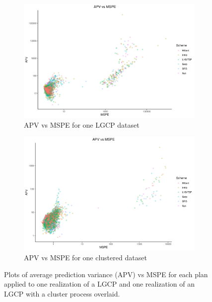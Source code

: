 \documentclass[review]{elsarticle}
\begin{document}
\begin{figure}

\begin{subfigure}{5in}
\includegraphics[width=5in]{../graphics/APV-MSPE-LGCP000004.png}
\caption{APV vs MSPE for one LGCP dataset}
\label{apvlgcp}
\end{subfigure}

\begin{subfigure}{5in}
\includegraphics[width=5in]{../graphics/APV-MSPE-Cluster000004.png}
\caption{APV vs MSPE for one clustered dataset}
\label{apvcluster}
\end{subfigure}

\caption{Plots of average prediction variance (APV) vs MSPE for each plan
applied to one realization of a LGCP and one realization of an LGCP with a
cluster process overlaid.}
\label{apvresults}
\end{figure}
\end{document}
